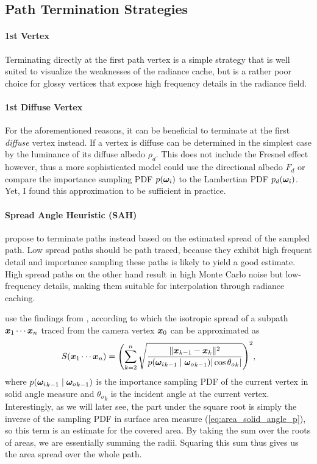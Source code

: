 \subsection{Path Termination Strategies}
\label{sec:path_termination}
\paragraph{1st Vertex}
\label{par:pt_1st_vertex}
Terminating directly at the first path vertex is a simple strategy that is well suited to visualize the weaknesses of the radiance cache, but is a rather poor choice for glossy vertices that expose high frequency details in the radiance field.

\paragraph{1st Diffuse Vertex}
\label{par:pt_1st_diffuse}
For the aforementioned reasons, it can be beneficial to terminate at the first \emph{diffuse} vertex instead.
If a vertex is diffuse can be determined in the simplest case by the luminance of its diffuse albedo $\rho_d$.
This does not include the Fresnel effect however, thus a more sophisticated model could use the directional albedo $F_d$ or compare the importance sampling PDF $p({\bm{\omega}_i})$ to the Lambertian PDF $p_d({\bm{\omega}_i})$.
Yet, I found this approximation to be sufficient in practice.

\paragraph{Spread Angle Heuristic (SAH)}
\label{par:pt_sah}
\textcite{muller2021} propose to terminate paths instead based on the estimated spread of the sampled path.
Low spread paths should be path traced, because they exhibit high frequent detail and importance sampling these paths is likely to yield a good estimate.
High spread paths on the other hand result in high Monte Carlo noise but low-frequency details, making them suitable for interpolation through radiance caching.


\textcite{muller2021} use the findings from \textcite{bekaert2003}, according to which the isotropic spread of a subpath $\bm{x}_1 \cdots \bm{x}_n$ traced from the camera vertex $\bm{x}_0$ can be approximated as
\begin{equation}
    S(\x_1 \cdots \x_n) = \left(\sum_{k=2}^{n} \sqrt{\frac{\|\x_{k-1} - \x_k\|^2}{p(\wi_{k-1} \mid \wo_{k-1}) |\cos {\theta_o}_k|}}\right)^2,
\end{equation}
where $p({\bm{\omega}_i}_{k-1} \mid {\bm{\omega}_o}_{k-1})$ is the importance sampling PDF of the current vertex in solid angle measure and ${\theta_o}_k$ is the incident angle at the current vertex.
Interestingly, as we will later see, the part under the square root is simply the inverse of the sampling PDF in surface area measure (\autoref{eq:area_solid_angle_p}), so this term is an estimate for the covered area.
By taking the sum over the roots of areas, we are essentially summing the radii.
Squaring this sum thus gives us the area spread over the whole path.

